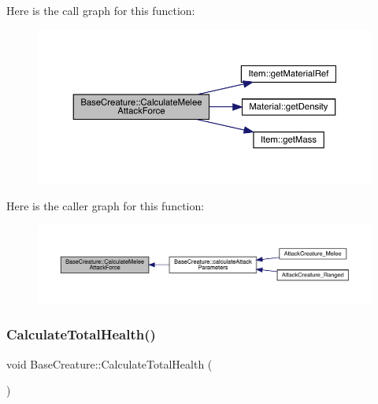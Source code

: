 Here is the call graph for this function\+:
\nopagebreak
\begin{figure}[H]
\begin{center}
\leavevmode
\includegraphics[width=350pt]{class_base_creature_ac81e681e444ed860c212463025d04a1d_cgraph}
\end{center}
\end{figure}
Here is the caller graph for this function\+:
\nopagebreak
\begin{figure}[H]
\begin{center}
\leavevmode
\includegraphics[width=350pt]{class_base_creature_ac81e681e444ed860c212463025d04a1d_icgraph}
\end{center}
\end{figure}
\mbox{\label{class_base_creature_ac5c9f52046801eb47701ef8b0f1eb32c}} 
\subsubsection{\texorpdfstring{Calculate\+Total\+Health()}{CalculateTotalHealth()}}
{\footnotesize\ttfamily void Base\+Creature\+::\+Calculate\+Total\+Health (\begin{DoxyParamCaption}{ }\end{DoxyParamCaption})}

\mbox{\label{class_base_creature_a8c7fec43bb0ca9a15e0f2596960283b7}} 
